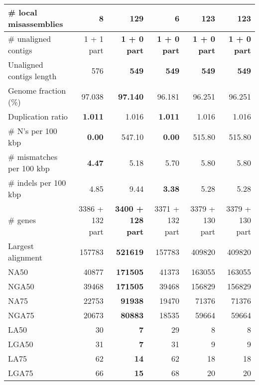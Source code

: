 \documentclass[12pt,a4paper]{article}
\begin{document}
\begin{table}[ht]
\begin{center}
\begin{tabular}{|l*{5}{|r}|}
\# local misassemblies & 8 & 129 & {\bf 6} & 123 & 123 \\ \hline
\# unaligned contigs & 1 + 1 part & {\bf 1 + 0 part} & {\bf 1 + 0 part} & {\bf 1 + 0 part} & {\bf 1 + 0 part} \\ \hline
Unaligned contigs length & 576 & {\bf 549} & {\bf 549} & {\bf 549} & {\bf 549} \\ \hline
Genome fraction (\%) & 97.038 & {\bf 97.140} & 96.181 & 96.251 & 96.251 \\ \hline
Duplication ratio & {\bf 1.011} & 1.016 & {\bf 1.011} & 1.016 & 1.016 \\ \hline
\# N's per 100 kbp & {\bf 0.00} & 547.10 & {\bf 0.00} & 515.80 & 515.80 \\ \hline
\# mismatches per 100 kbp & {\bf 4.47} & 5.18 & 5.70 & 5.80 & 5.80 \\ \hline
\# indels per 100 kbp & 4.85 & 9.44 & {\bf 3.38} & 5.28 & 5.28 \\ \hline
\# genes & 3386 + 132 part & {\bf 3400 + 128 part} & 3371 + 132 part & 3379 + 130 part & 3379 + 130 part \\ \hline
Largest alignment & 157783 & {\bf 521619} & 157783 & 409820 & 409820 \\ \hline
NA50 & 40877 & {\bf 171505} & 41373 & 163055 & 163055 \\ \hline
NGA50 & 39468 & {\bf 171505} & 39468 & 156829 & 156829 \\ \hline
NA75 & 22753 & {\bf 91938} & 19470 & 71376 & 71376 \\ \hline
NGA75 & 20673 & {\bf 80883} & 18535 & 59664 & 59664 \\ \hline
LA50 & 30 & {\bf 7} & 29 & 8 & 8 \\ \hline
LGA50 & 31 & {\bf 7} & 31 & 9 & 9 \\ \hline
LA75 & 62 & {\bf 14} & 62 & 18 & 18 \\ \hline
LGA75 & 66 & {\bf 15} & 68 & 20 & 20 \\ \hline
\end{tabular}
\end{center}
\end{table}
\end{document}
